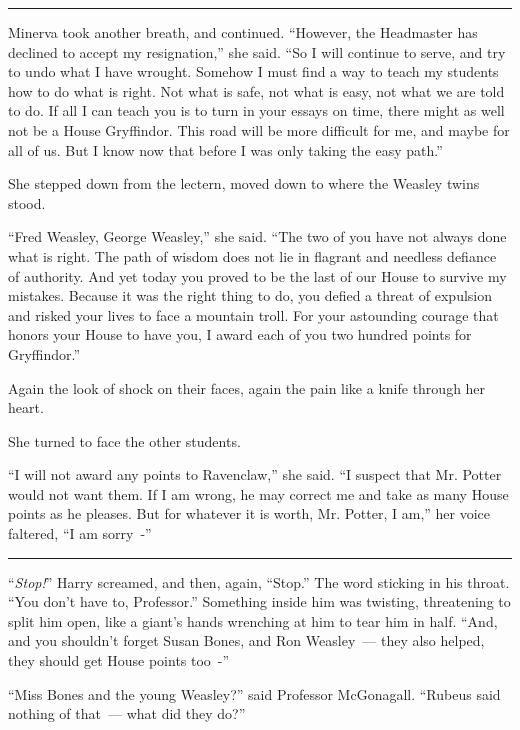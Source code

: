\begin{center}\rule{3in}{0.4pt}\end{center}

Minerva took another breath, and continued. ``However, the Headmaster has declined to accept my resignation,'' she said. ``So I will continue to serve, and try to undo what I have wrought. Somehow I must find a way to teach my students how to do what is right. Not what is safe, not what is easy, not what we are told to do. If all I can teach you is to turn in your essays on time, there might as well not be a House Gryffindor. This road will be more difficult for me, and maybe for all of us. But I know now that before I was only taking the easy path.''

She stepped down from the lectern, moved down to where the Weasley twins stood.

``Fred Weasley, George Weasley,'' she said. ``The two of you have not always done what is right. The path of wisdom does not lie in flagrant and needless defiance of authority. And yet today you proved to be the last of our House to survive my mistakes. Because it was the right thing to do, you defied a threat of expulsion and risked your lives to face a mountain troll. For your astounding courage that honors your House to have you, I award each of you two hundred points for Gryffindor.''

Again the look of shock on their faces, again the pain like a knife through her heart.

She turned to face the other students.

``I will not award any points to Ravenclaw,'' she said. ``I suspect that Mr. Potter would not want them. If I am wrong, he may correct me and take as many House points as he pleases. But for whatever it is worth, Mr. Potter, I am,'' her voice faltered, ``I am sorry~-''

\begin{center}\rule{3in}{0.4pt}\end{center}

``\emph{Stop!}'' Harry screamed, and then, again, ``Stop.'' The word sticking in his throat. ``You don't have to, Professor.'' Something inside him was twisting, threatening to split him open, like a giant's hands wrenching at him to tear him in half. ``And, and you shouldn't forget Susan Bones, and Ron Weasley~--- they also helped, they should get House points too~-''

``Miss Bones and the young Weasley?'' said Professor McGonagall. ``Rubeus said nothing of that~--- what did they do?''

